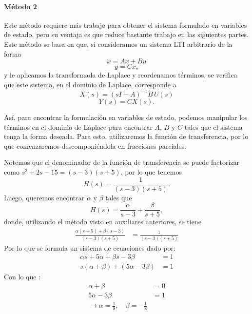 \documentclass[
  11pt,
  letterpaper,
   addpoints,
   answers
  ]{exam}
\begin{document}
\begin{questions}
\begin{solution}
\paragraph{Método 2}
Este método requiere más trabajo para obtener el sistema formulado en variables de estado, pero su ventaja es que reduce bastante trabajo en las siguientes partes. Este método se basa en que, si consideramos un sistema LTI arbitrario de la forma
\begin{equation}
\dot{x} = A x + B u
\end{equation}
\begin{equation}
y = C x,
\end{equation}
y le aplicamos la transformada de Laplace y reordenamos términos, se verifica que este sistema, en el dominio de Laplace, corresponde a
\begin{equation}
X(s) = (sI - A)^{-1} B\, U(s)
\end{equation}
\begin{equation}
Y(s) = C X(s).
\end{equation}

Así, para encontrar la formulación en variables de estado, podemos manipular los términos en el dominio de Laplace para encontrar $A$, $B$ y $C$ tales que el sistema tenga la forma deseada. Para esto, utilizaremos la función de transferencia, por lo que comenzaremos descomponiéndola en fracciones parciales.

Notemos que el denominador de la función de transferencia se puede factorizar como $s^2 + 2s - 15 = (s-3)(s+5)$, por lo que tenemos
\begin{equation}
H(s) = \frac{1}{(s-3)(s+5)}.
\end{equation}
Luego, queremos encontrar $\alpha$ y $\beta$ tales que
\begin{equation}
H(s) = \frac{\alpha}{s-3} + \frac{\beta}{s+5},
\end{equation}
donde, utilizando el método visto en auxiliares anteriores, se tiene
\begin{align}
  \frac{\alpha(s+5) + \beta(s-3)}{(s-3)(s+5)} &= \frac{1}{(s-3)(s+5)}
\end{align}
Por lo que se formula un sistema de ecuaciones dado por:
\begin{align}
  \alpha s + 5\alpha + \beta s - 3\beta &= 1\\
  s(\alpha + \beta) + (5\alpha - 3\beta) &= 1
\end{align}
Con lo que :
\begin{align}
  \alpha + \beta &= 0 \\
  5\alpha - 3\beta &= 1 \\
  \rightarrow
  \alpha = \frac{1}{8}, \quad \beta = -\frac{1}{8}
\end{align}



\end{solution}
\end{questions}
\end{document}
